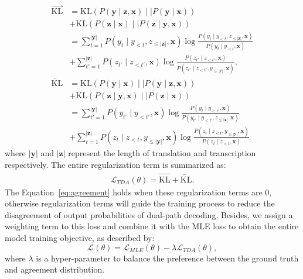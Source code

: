 \documentclass[letterpaper]{article} %
\begin{document}
\begin{equation}
    \begin{aligned}
        \overrightarrow{\text{KL}} & = \text{KL} \left( P\left( \mathbf{y} \mid \mathbf{z}, \mathbf{x} \right) \mid\mid P\left( \mathbf{y} \mid \mathbf{x} \right) \right) \\ 
        & + \text{KL} \left(P\left( \mathbf{z} \mid \mathbf{x} \right) \mid\mid P\left( \mathbf{z} \mid \mathbf{y}, \mathbf{x} \right) \right)\\
        & = \sum_{t=1}^{|\mathbf{y}|}  P\left(y_{t} \mid y_{<t},z_{\leq|\mathbf{z}|}, \mathbf{x} \right) \log \frac{P\left(y_{t} \mid y_{<t},z_{\leq|\mathbf{z}|}, \mathbf{x} \right)}{P\left(y_{t} \mid y_{<t}, \mathbf{x} \right)} \\
        & + \sum_{t'=1}^{|\mathbf{z}|}  P\left(z_{t'} \mid z_{<t'}, \mathbf{x} \right) \log \frac{P\left(z_{t'} \mid z_{<t'}, \mathbf{x} \right)}{P\left(z_{t'} \mid z_{<t'},y_{\leq|\mathbf{y}|}, \mathbf{x} \right)}, \\
        \overleftarrow{\text{KL}} & =   \text{KL} \left( P\left( \mathbf{y} \mid \mathbf{x} \right) \mid\mid P\left( \mathbf{y} \mid \mathbf{z}, \mathbf{x} \right) \right) \\ 
        & + \text{KL} \left( P\left( \mathbf{z} \mid \mathbf{y}, \mathbf{x} \right) \mid\mid P\left( \mathbf{z} \mid \mathbf{x} \right) \right) \\
        & = \sum_{t'=1}^{|\mathbf{y}|}  P\left(y_{t'} \mid y_{<t'}, \mathbf{x} \right) \log \frac{P\left(y_{t} \mid y_{<t'}, \mathbf{x} \right)}{P\left(y_{t'} \mid y_{<t'},z_{\leq|\mathbf{z}|}, \mathbf{x} \right)} \\
        & + \sum_{t=1}^{|\mathbf{z}|}  P\left(z_{t} \mid z_{<t},y_{\leq|\mathbf{y}|}, \mathbf{x} \right) \log \frac{P\left(z_{t} \mid z_{<t},y_{\leq|\mathbf{y}|}, \mathbf{x} \right)}{P\left(z_{t} \mid z_{<t}, \mathbf{x} \right)}
    \end{aligned}
    \label{eq:kl2}
\end{equation}
where $|\mathbf{y}|$ and $|\mathbf{z}|$ represent the length of translation and transcription respectively.
The entire regularization term is summarized as: 
\begin{equation}
    \begin{aligned}
        \mathcal{L}_{TDA}(\theta)= \overrightarrow{\text{KL}} +  \overleftarrow{\text{KL}}.
    \end{aligned}
    \label{eq:loss_tda}
\end{equation}
The Equation~\ref{eq:agreement} holds when these regularization terms are $0$, otherwise regularization terms will guide the training process to reduce the disagreement of output probabilities of dual-path decoding.
Besides, we assign a weighting term to this loss and combine it with the MLE loss to obtain the entire model training objective, as described by:
\begin{equation} 
    \mathcal{L}_{}(\theta) = \mathcal{L}_{MLE}(\theta) - \lambda \mathcal{L}_{TDA}(\theta),
    \label{eq:loss_overall}
\end{equation}
where $\lambda$ is a hyper-parameter to balance the preference between the ground truth and agreement distribution.
\end{document}
